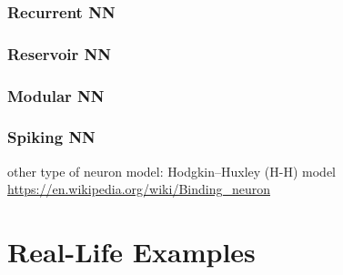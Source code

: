 \subsubsection{Recurrent NN}
\subsubsection{Reservoir NN}
\subsubsection{Modular NN}
\subsubsection{Spiking NN}
other type of neuron model: Hodgkin–Huxley (H-H) model
\url{ https://en.wikipedia.org/wiki/Binding_neuron }

\section{Real-Life Examples}
\label{sec:Real-Life_Examples}